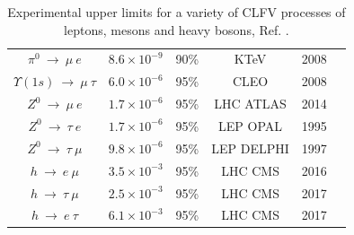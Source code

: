 \begin{center}
\begin{table}[!h]
\begin{tabular}{c c c c c c}
$\pi^0 \ \rightarrow \ \mu \ e$ & $8.6 \times 10^{-9}$ & 90\% & KTeV & 2008 & \cite{KTeV:2007cvy}\\
$\Upsilon (1s) \ \rightarrow \ \mu \ \tau $ & $6.0 \times 10^{-6}$ & 95\% & CLEO & 2008 & \cite{Love_2008}\\
\hline
$Z^0 \ \rightarrow \ \mu \ e$ & $1.7 \times 10^{-6}$ & 95\% &  LHC ATLAS & 2014 & \cite{Aad_2014} \\
$Z^0 \ \rightarrow \ \tau \ e$ & $1.7 \times 10^{-6}$ & 95\% &  LEP OPAL & 1995 & \cite{akers}\\
$Z^0 \ \rightarrow \ \tau \ \mu$ & $9.8 \times 10^{-6}$ & 95\% &  LEP DELPHI & 1997 & \cite{abreu}\\
$h \ \rightarrow \ e \ \mu$ & $3.5 \times 10^{-3}$ & 95\% & LHC CMS & 2016 & \cite{PhysRevD.104.032013}\\
$h \ \rightarrow \ \tau  \ \mu$ & $2.5 \times 10^{-3}$ & 95\% & LHC CMS & 2017 & \cite{cms17}\\
$h \ \rightarrow \ e \ \tau$ & $6.1 \times 10^{-3}$ & 95\% & LHC CMS & 2017 & \cite{cms17}\\
\hline
\end{tabular}
\caption{Experimental upper limits for a variety of CLFV processes of leptons, mesons and heavy bosons, Ref. \cite{clfv_signorelli}.}
\end{table}\label{tab:upperlimits}
\end{center}
\vspace{-15mm}
